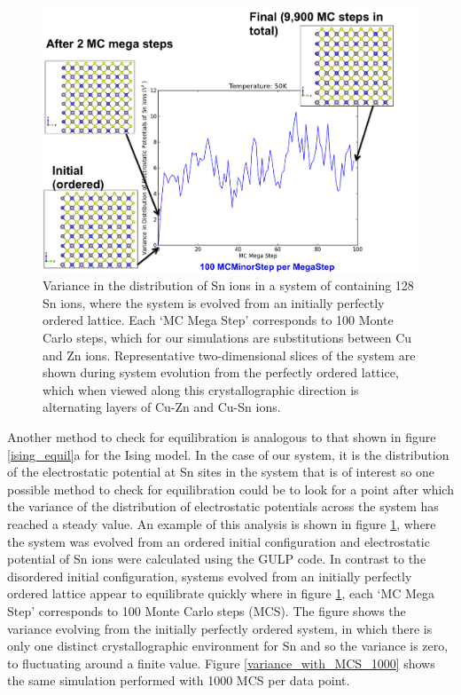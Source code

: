 \begin{figure}[h!]
  \centering
    \includegraphics[width=1.0\textwidth]{figures/50K_100Minor-per-mega+visuals.png}
    \caption{Variance in the distribution of Sn ions in a system of containing 128 Sn ions, where the system is evolved from an initially perfectly ordered lattice. Each `MC Mega Step' corresponds to 100 Monte Carlo steps, which for our simulations are substitutions between Cu and Zn ions. Representative two-dimensional slices of the system are shown during system evolution from the perfectly ordered lattice, which when viewed along this crystallographic direction is alternating layers of Cu-Zn and Cu-Sn ions.}
  \label{variance_with_MCS}
\end{figure}

Another method to check for equilibration is analogous to that shown in figure \ref{ising_equil}a for the Ising model. In the case of our system, it is the distribution of the electrostatic potential at Sn sites in the system that is of interest so one possible method to check for equilibration could be to look for a point after which the variance of the distribution of electrostatic potentials across the system has reached a steady value. An example of this analysis is shown in figure \ref{variance_with_MCS}, where the system was evolved from an ordered initial configuration and electrostatic potential of Sn ions were calculated using the GULP code. In contrast to the disordered initial configuration, systems evolved from an initially perfectly ordered lattice appear to equilibrate quickly where in figure \ref{variance_with_MCS}, each `MC Mega Step' corresponds to 100 Monte Carlo steps (MCS). The figure shows the variance evolving from the initially perfectly ordered system, in which there is only one distinct crystallographic environment for Sn and so the variance is zero, to fluctuating around a finite value. Figure \ref{variance_with_MCS_1000} shows the same simulation performed with 1000 MCS per data point.

